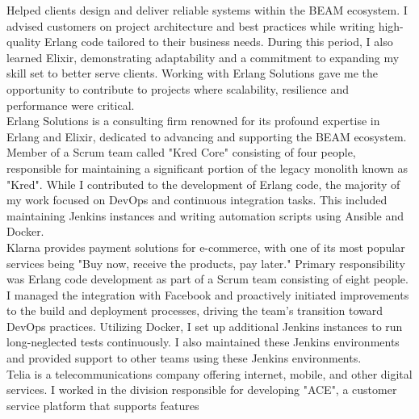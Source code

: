 \documentclass[purpleprocv]{procv}
\begin{document}
\begin{procv-twocolumns}
{          
          {Helped clients design and deliver reliable systems 
          within the BEAM ecosystem. I advised customers on project architecture and best practices 
          while writing high-quality Erlang code tailored to their business needs. During this period, 
          I also learned Elixir, demonstrating adaptability and a commitment to expanding my skill set 
          to better serve clients. Working with Erlang Solutions gave me the opportunity to contribute 
          to projects where scalability, resilience and performance were critical.
          \\[3pt]
          Erlang Solutions is a consulting firm renowned for its profound expertise in Erlang and Elixir, 
          dedicated to advancing and supporting the BEAM ecosystem.}
          {Member of a Scrum team called "Kred Core" consisting of four people, responsible for maintaining a significant portion of 
          the legacy monolith known as "Kred". While I contributed to the development of Erlang code, the majority 
          of my work focused on DevOps and continuous integration tasks. This included maintaining Jenkins instances 
          and writing automation scripts using Ansible and Docker.
          \\[3pt]
          Klarna provides payment solutions for e-commerce, with one of its most popular services being 
          "Buy now, receive the products, pay later."}
          {Primary responsibility was Erlang code development as part of a Scrum team consisting of eight people. I managed the integration 
          with Facebook and proactively initiated improvements 
          to the build and deployment processes, driving the team’s transition toward DevOps practices. Utilizing 
          Docker, I set up additional Jenkins instances to run long-neglected tests continuously. I also maintained 
          these Jenkins environments and provided support to other teams using these Jenkins environments.
          \\[3pt]
          Telia is a telecommunications company offering internet, mobile, and other digital services. I worked 
          in the division responsible for developing "ACE", a customer service platform that supports features 
}}
\end{procv-twocolumns}
\end{document}

